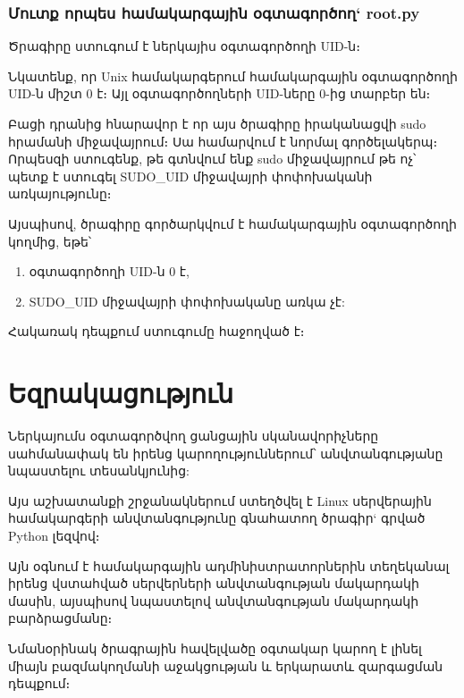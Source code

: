 \documentclass[a4paper,12pt]{article}
\begin{document}
\begin{sloppypar}
\subsubsection{Մուտք որպես համակարգային օգտագործող` root.py}


Ծրագիրը ստուգում է ներկայիս օգտագործողի UID-ն։

Նկատենք, որ Unix համակարգերում համակարգային օգտագործողի UID-ն միշտ 0 է։
Այլ օգտագործողների UID-ները 0-ից տարբեր են։

Բացի դրանից հնարավոր է որ այս ծրագիրը իրականացվի sudo հրամանի միջավայրում։
Սա համարվում է նորմալ գործելակերպ։ Որպեսզի ստուգենք, թե գտնվում ենք sudo
միջավայրում թե ոչ՝ պետք է ստուգել SUDO\_UID միջավայրի փոփոխականի
առկայությունը։

Այսպիսով, ծրագիրը գործարկվում է համակարգային օգտագործողի կողմից, եթե՝
\begin{enumerate}
\item օգտագործողի UID-ն 0 է,
\item SUDO\_UID միջավայրի փոփոխականը առկա չէ:
\end{enumerate}

Հակառակ դեպքում ստուգումը հաջողված է։


\newpage
\section{Եզրակացություն}


Ներկայումս օգտագործվող ցանցային սկանավորիչները սահմանափակ են
իրենց կարողություններում՝ անվտանգությանը նպաստելու
տեսանկյունից:

Այս աշխատանքի շրջանակներում ստեղծվել է Linux սերվերային
համակարգերի անվտանգությունը գնահատող
ծրագիր` գրված Python լեզվով։

Այն օգնում է համակարգային ադմինիստրատորներին տեղեկանալ
իրենց վստահված սերվերների անվտանգության մակարդակի մասին,
այսպիսով նպաստելով անվտանգության մակարդակի բարձրացմանը։

Նմանօրինակ ծրագրային հավելվածը օգտակար կարող է
լինել միայն բազմակողմանի աջակցության և երկարատև զարգացման
դեպքում։


\newpage

\end{sloppypar}
\end{document}
